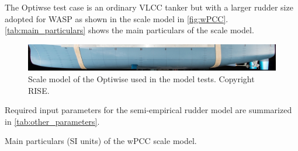 The Optiwse test case is an ordinary VLCC tanker but with a larger rudder size adopted for WASP as shown in the scale model in  \autoref{fig:wPCC}. 
\autoref{tab:main_particulars} shows the main particulars of the scale model. 
\begin{figure}[h]
    \centering
    \includegraphics[width=\columnwidth]{figures/5m2.jpg}
    \caption{Scale model of the Optiwise used in the model tests. Copyright RISE.}
    \label{fig:wPCC}
\end{figure}
Required input parameters for the semi-empirical rudder model are summarized in \autoref{tab:other_parameters}.
\begin{table}[h]
    \centering
    \caption{Main particulars (SI units) of the wPCC scale model.}
    \label{tab:main_particulars_optiwise}
\end{table}